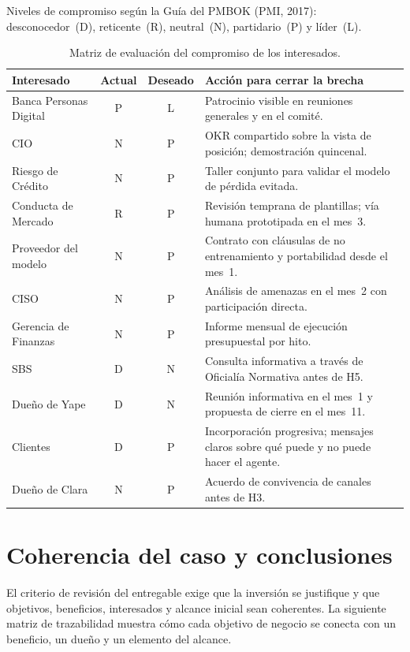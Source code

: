 \documentclass[11pt,a4paper]{article}
\begin{document}
Niveles de compromiso según la Guía del PMBOK (PMI, 2017): desconocedor~(D), reticente~(R), neutral~(N), partidario~(P) y líder~(L).

\begin{table}[H]
\centering
\caption{Matriz de evaluación del compromiso de los interesados.}
\small
\begin{tabularx}{\textwidth}{@{}p{3.8cm} c c X@{}}
\toprule
\textbf{Interesado} & \textbf{Actual} & \textbf{Deseado} & \textbf{Acción para cerrar la brecha} \\
\midrule
Banca Personas Digital & P & L & Patrocinio visible en reuniones generales y en el comité. \\
CIO & N & P & OKR compartido sobre la vista de posición; demostración quincenal. \\
Riesgo de Crédito & N & P & Taller conjunto para validar el modelo de pérdida evitada. \\
Conducta de Mercado & R & P & Revisión temprana de plantillas; vía humana prototipada en el mes~3. \\
Proveedor del modelo & N & P & Contrato con cláusulas de no entrenamiento y portabilidad desde el mes~1. \\
CISO & N & P & Análisis de amenazas en el mes~2 con participación directa. \\
Gerencia de Finanzas & N & P & Informe mensual de ejecución presupuestal por hito. \\
SBS & D & N & Consulta informativa a través de Oficialía Normativa antes de H5. \\
Dueño de Yape & D & N & Reunión informativa en el mes~1 y propuesta de cierre en el mes~11. \\
Clientes & D & P & Incorporación progresiva; mensajes claros sobre qué puede y no puede hacer el agente. \\
Dueño de Clara & N & P & Acuerdo de convivencia de canales antes de H3. \\
\bottomrule
\end{tabularx}
\end{table}

\clearpage
\section{Coherencia del caso y conclusiones}\label{sec:coherencia}

El criterio de revisión del entregable exige que la inversión se justifique y que objetivos, beneficios, interesados y alcance inicial sean coherentes. La siguiente matriz de trazabilidad muestra cómo cada objetivo de negocio se conecta con un beneficio, un dueño y un elemento del alcance.
\end{document}
